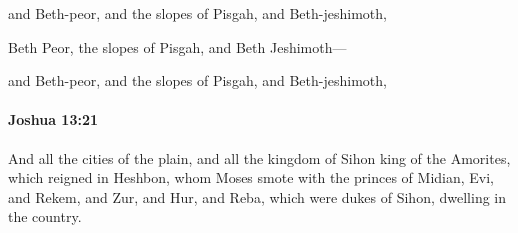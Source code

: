 			\begin{versebox}
					\item[BHS] 
					\item[ASV] and Beth-peor, and the slopes of Pisgah, and Beth-jeshimoth,
					\item[NIV] Beth Peor, the slopes of Pisgah, and Beth Jeshimoth—
					\item[NRSV] and Beth-peor, and the slopes of Pisgah, and Beth-jeshimoth,
			\end{versebox}

		\paragraph{Joshua 13:21} %
			\label{JOSHUA-13-21}

			And all the cities of the plain, and all the kingdom of Sihon king of the Amorites, which reigned in Heshbon, whom Moses smote with the princes of Midian, Evi, and Rekem, and Zur, and Hur, and Reba, which were dukes of Sihon, dwelling in the country.

